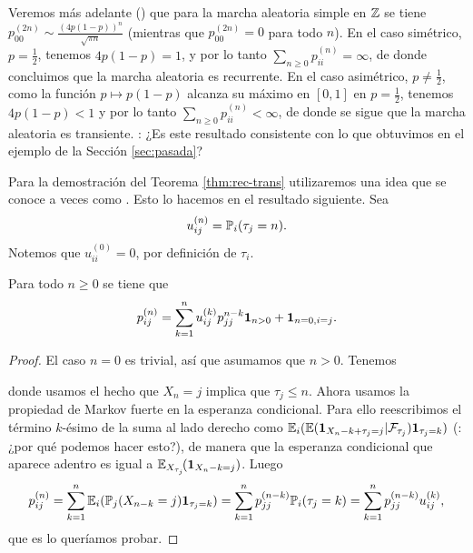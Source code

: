 \begin{ex}\label{ex:srw-rec-1}
Veremos más adelante (\ucmark) que para la marcha aleatoria simple en $\mathbb{Z}$ se tiene $p^{(2n)}_{00}\sim\frac{(4p(1-p))^n}{\sqrt{\pi n}}$ (mientras que $p^{(2n)}_{00}=0$ para todo $n$).
En el caso simétrico, $p=\frac12$, tenemos $4p(1-p)=1$, y por lo tanto $\sum_{n\geq0}p_{ii}^{(n)}=\infty$, de donde concluimos que la marcha aleatoria es recurrente.
En el caso asimétrico, $p\neq\frac12$, como la función $p\longmapsto p(1-p)$ alcanza su máximo en $[0,1]$ en $p=\frac12$, tenemos $4p(1-p)<1$ y por lo tanto $\sum_{n\geq0}p_{ii}^{(n)}<\infty$, de donde se sigue que la marcha aleatoria es transiente.
\uexer: ¿Es este resultado consistente con lo que obtuvimos en el ejemplo de la Sección \ref{sec:pasada}?
\end{ex}

Para la demostración del Teorema \ref{thm:rec-trans} utilizaremos una idea que se conoce a veces como .
Esto lo hacemos en el resultado siguiente.
Sea
\begin{equation}
u^{(n)}_{ij}=\mathbb{P}_i(\tau_j=n).\label{eq:uijn}
\end{equation}
Notemos que $u^{(0)}_{ii}=0$, por definición de $\tau_i$.

\begin{lem}
Para todo $n\geq0$ se tiene que
\[p_{ij}^{(n)}=\sum_{k=1}^nu_{ij}^{(k)}p_{jj}^{n-k}\mathbf{1}_{n>0}+\mathbf{1}_{n=0,i=j}.\]
\end{lem}

\begin{proof}
El caso $n=0$ es trivial, así que asumamos que $n>0$.
Tenemos

donde usamos el hecho que $X_n=j$ implica que $\tau_j\leq n$.
Ahora usamos la propiedad de Markov fuerte en la esperanza condicional.
Para ello reescribimos el término $k$-ésimo de la suma al lado derecho como $\mathbb{E}_i(\mathbb{E}(\mathbf{1}_{X_n-k+\tau_j=j}|\mathcal{F}_{\tau_j})\mathbf{1}_{\tau_j=k})$ (\uexers: ¿por qué podemos hacer esto?), de manera que la esperanza condicional que aparece adentro es igual a $\mathbb{E}_{X_{\tau_j}}\!(\mathbf{1}_{X_n-k=j})$.
Luego
\[p_{ij}^{(n)}=\sum_{k=1}^n\mathbb{E}_i(\mathbb{P}_j(X_{n-k}=j)\mathbf{1}_{\tau_j=k})=\sum_{k=1}^np^{(n-k)}_{jj}\mathbb{P}_i(\tau_j=k)=\sum_{k=1}^np^{(n-k)}_{jj}u_{ij}^{(k)},\]
que es lo queríamos probar.
\end{proof}

